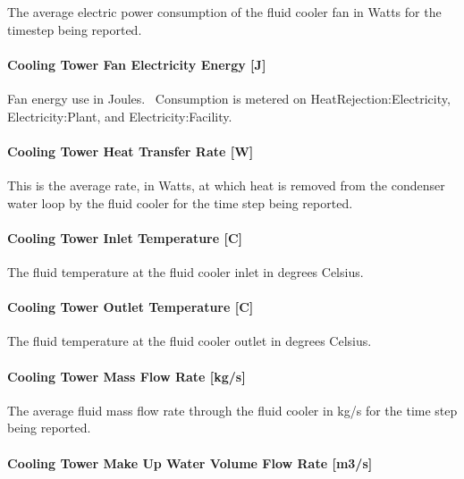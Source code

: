 The average electric power consumption of the fluid cooler fan in Watts for the timestep being reported.

\paragraph{Cooling Tower Fan Electricity Energy {[}J{]}}\label{cooling-tower-fan-electric-energy-j-5}

Fan energy use in Joules.~ Consumption is metered on HeatRejection:Electricity, Electricity:Plant, and Electricity:Facility.

\paragraph{Cooling Tower Heat Transfer Rate {[}W{]}}\label{cooling-tower-heat-transfer-rate-w-5}

This is the average rate, in Watts, at which heat is removed from the condenser water loop by the fluid cooler for the time step being reported.

\paragraph{Cooling Tower Inlet Temperature {[}C{]}}\label{cooling-tower-inlet-temperature-c-5}

The fluid temperature at the fluid cooler inlet in degrees Celsius.

\paragraph{Cooling Tower Outlet Temperature {[}C{]}}\label{cooling-tower-outlet-temperature-c-5}

The fluid temperature at the fluid cooler outlet in degrees Celsius.

\paragraph{Cooling Tower Mass Flow Rate {[}kg/s{]}}\label{cooling-tower-mass-flow-rate-kgs-5}

The average fluid mass flow rate through the fluid cooler in kg/s for the time step being reported.

\paragraph{Cooling Tower Make Up Water Volume Flow Rate {[}m3/s{]}}\label{cooling-tower-make-up-water-volume-flow-rate-m3s-5}

